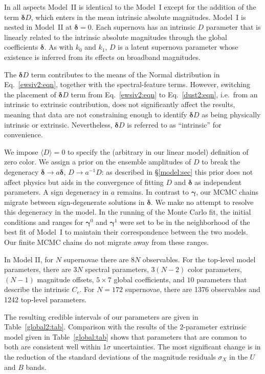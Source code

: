 \documentclass{aastex61}   	%
\begin{document}
In all aspects Model~II is identical to the Model~I except for the addition of the term $\pmb{\delta} D$,
which enters in the mean intrinsic
absolute magnitudes.  Model~I is nested in Model~II at $\pmb{\delta}=0$.
Each supernova has an intrinsic $D$ parameter that is linearly related to the intrinsic
absolute magnitudes through the global coefficients $\pmb{\delta}$.  As with $k_0$ and $k_1$,  $D$ is a latent supernova parameter whose existence is inferred from
its effects on broadband magnitudes.


The $\pmb{\delta} D$ term contributes to the means of the Normal distribution in Eq.~\ref{ewsiv2:eqn}, together with the spectral-feature terms.
However, switching the placement of 
$\pmb{\delta} D$ term from Eq.~\ref{ewsiv2:eqn} to Eq.~\ref{dust2:eqn}, i.e.\ from an intrinsic to extrinsic contribution,
does not significantly affect the results, meaning that data are not constraining enough
to identify $\pmb{\delta} D$ as being physically intrinsic or extrinsic.  Nevertheless, $\pmb{\delta} D$ is referred to as ``intrinsic''  for convenience.

\color{red}
We impose
$\langle D\rangle=0$
to specify the (arbitrary in our linear model) definition of zero color.  We assign a prior on the ensemble amplitudes of $D$ to break the
degeneracy $\pmb{\delta} \rightarrow a\pmb{\delta}$, $D \rightarrow a^{-1}D$: as described
in \S\ref{model:sec} this prior does not affect physics but aids in the convergence of fitting $D$ and $\pmb{\delta}$ as independent parameters.
A sign degeneracy in $a$ remains.
In contrast to $\pmb{\gamma}$, our MCMC chains migrate between sign-degenerate solutions in  $\pmb{\delta}$.  We make
no attempt to resolve this degeneracy in the model.
In the running of the Monte Carlo fit, the initial conditions and ranges for
$\pmb{\gamma}^0$ and $\pmb{\gamma}^1$ were set to be in the neighborhood of the best fit of Model~I
to maintain their correspondence between the two models. Our finite MCMC chains do not migrate away from these ranges.
\color{black}

In Model II, for $N$ supernovae there are $8N$ observables.  For the top-level model parameters, there are $3N$ spectral parameters, $3(N-2)$
color parameters, $(N-1)$ magnitude offsets,  $5 \times 7$ global coefficients, and $10$ parameters that describe the intrinsic
$C_c$.  For $N=172$ supernovae, there are 1376 observables and 1242 top-level parameters.

The resulting credible intervals of our parameters are given in Table~\ref{global2:tab}.  Comparison with the
results of the 2-parameter extrinsic model given in Table~\ref{global:tab} shows that  parameters that are common to both
are consistent well within 1$\sigma$ uncertainties.  The most significant change is in the reduction of the standard
deviations of the magnitude residuals $\sigma_X$
\color{red}
in the $U$ and $B$ bands.
\color{black}
\end{document}
